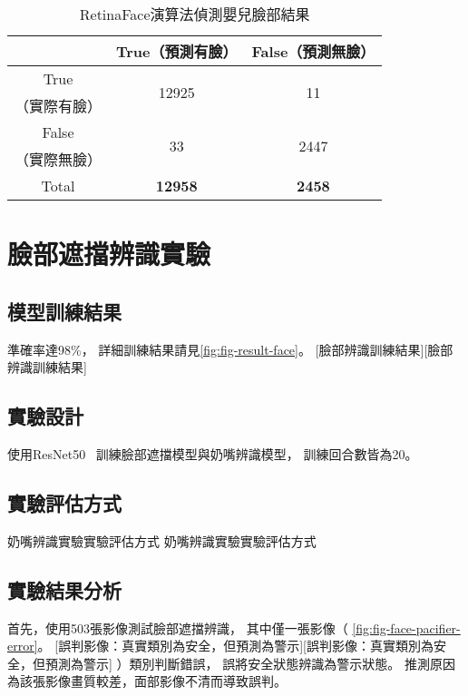 \documentclass[class=NCU_thesis, crop=false]{standalone}
\begin{document}
\begin{table}[h]
    \centering
    \caption{RetinaFace演算法偵測嬰兒臉部結果}
    \label{table:table-retinaface}
    \begin{tabular}{ccc}
    \hline
     & True（預測有臉）& False（預測無臉）\\
    \hline
    True & \multirow{2}{*}{12925} & \multirow{2}{*}{11} \\
    （實際有臉）& & \\
    False & \multirow{2}{*}{33} & \multirow{2}{*}{2447} \\
    （實際無臉）&  & \\
    \hline
    Total & \textbf{12958} & \textbf{2458} \\
    \hline
    \end{tabular}
\end{table}

\section{臉部遮擋辨識實驗}
\subsection{模型訓練結果}
準確率達98\%，
詳細訓練結果請見\cref{fig:fig-result-face}。
[臉部辨識訓練結果][臉部辨識訓練結果]

\subsection{實驗設計}
使用ResNet50~\cite{he_deep_2016}
訓練臉部遮擋模型與奶嘴辨識模型，
訓練回合數皆為20。

\subsection{實驗評估方式}
奶嘴辨識實驗實驗評估方式 奶嘴辨識實驗實驗評估方式

\subsection{實驗結果分析}
首先，使用503張影像測試臉部遮擋辨識，
其中僅一張影像（
\cref{fig:fig-face-pacifier-error}。
[誤判影像：真實類別為安全，但預測為警示][誤判影像：真實類別為安全，但預測為警示]
）類別判斷錯誤，
誤將安全狀態辨識為警示狀態。
推測原因為該張影像畫質較差，面部影像不清而導致誤判。
\end{document}
